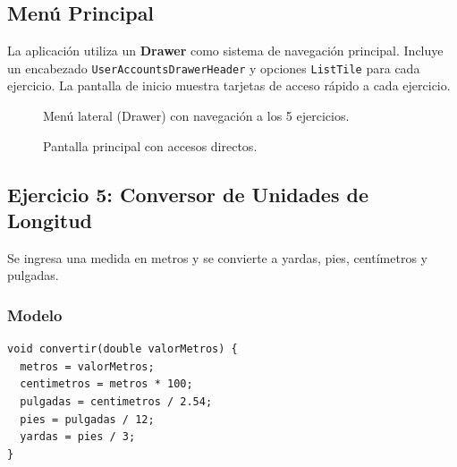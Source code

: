 \documentclass{article}
\begin{document}
\subsection{Menú Principal}
La aplicación utiliza un \textbf{Drawer} como sistema de navegación principal. Incluye un encabezado \texttt{UserAccountsDrawerHeader} y opciones \texttt{ListTile} para cada ejercicio. La pantalla de inicio muestra tarjetas de acceso rápido a cada ejercicio.

\begin{figure}[H]
    \centering
    \caption{Menú lateral (Drawer) con navegación a los 5 ejercicios.}
    \label{fig:menu}
\end{figure}

\begin{figure}[H]
    \centering
    \caption{Pantalla principal con accesos directos.}
    \label{fig:inicio}
\end{figure}

\newpage

\subsection{Ejercicio 5: Conversor de Unidades de Longitud}
Se ingresa una medida en metros y se convierte a yardas, pies, centímetros y pulgadas.

\subsubsection{Modelo}
\begin{tcolorbox}[title=ConversionLongitudModel]
\begin{lstlisting}
void convertir(double valorMetros) {
  metros = valorMetros;
  centimetros = metros * 100;
  pulgadas = centimetros / 2.54;
  pies = pulgadas / 12;
  yardas = pies / 3;
}
\end{lstlisting}
\end{tcolorbox}
\end{document}
